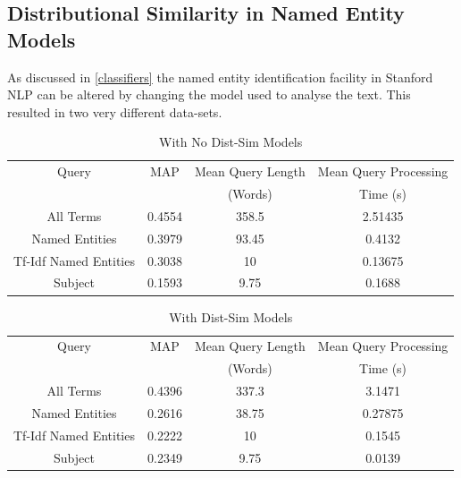 \documentclass{l4proj}
\begin{document}
\subsection{Distributional Similarity in Named Entity Models}
As discussed in \ref{classifiers} the named entity identification facility in Stanford NLP can be altered by changing the model used to analyse the text. This resulted in two very different data-sets.
\begin{center}
\begin{table}[h]
\centering
\begin{tabular}{|c|c|c|c|}
\hline
Query                 & MAP    & Mean Query Length & Mean Query Processing \\ 
& & (Words) & Time (s) \\\hline
All Terms             & 0.4554 & 358.5             & 2.51435                        \\ \hline
Named Entities        & 0.3979 & 93.45             & 0.4132                         \\ \hline
Tf-Idf Named Entities & 0.3038 & 10                & 0.13675                       \\ \hline
Subject               & 0.1593 & 9.75              & 0.1688                        \\ \hline
\end{tabular}
\caption{With No Dist-Sim Models}
\label{results}
\end{table}
\end{center}
\begin{center}
\begin{table}[h]
\centering
\begin{tabular}{|c|c|c|c|}
\hline
Query                 & MAP    & Mean Query Length & Mean Query Processing \\ 
& & (Words) & Time (s) \\\hline
All Terms             & 0.4396 & 337.3             & 3.1471                       \\ \hline
Named Entities        & 0.2616 & 38.75             & 0.27875                         \\ \hline
Tf-Idf Named Entities & 0.2222 & 10                & 0.1545                       \\ \hline
Subject               & 0.2349 & 9.75              & 0.0139                        \\ \hline
\end{tabular}
\caption{With Dist-Sim Models}
\label{results}
\end{table}
\end{center}
\end{document}
